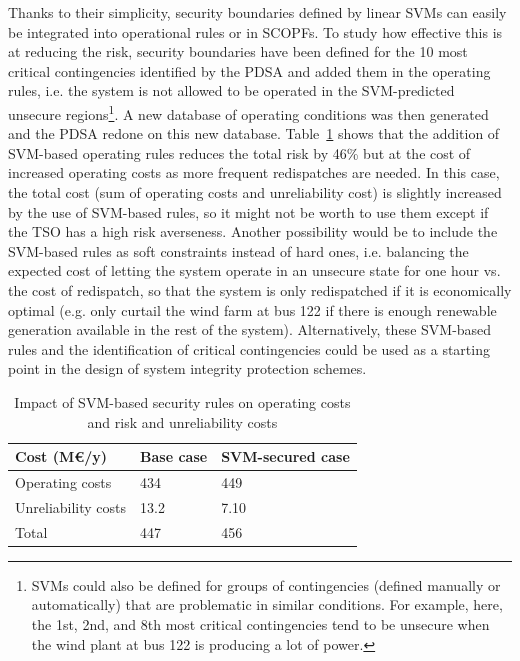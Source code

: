 Thanks to their simplicity, security boundaries defined by linear SVMs can easily be integrated into operational rules or in SCOPFs. To study how effective this is at reducing the risk, security boundaries have been defined for the 10 most critical contingencies identified by the PDSA and added them in the operating rules, i.e. the system is not allowed to be operated in the SVM-predicted unsecure regions\footnote{SVMs could also be defined for groups of contingencies (defined manually or automatically) that are problematic in similar conditions. For example, here, the 1st, 2nd, and 8th most critical contingencies tend to be unsecure when the wind plant at bus 122 is producing a lot of power.}. A new database of operating conditions was then generated and the PDSA redone on this new database. Table~\ref{tab:enhancement} shows that the addition of SVM-based operating rules reduces the total risk by 46\% but at the cost of increased operating costs as more frequent redispatches are needed. In this case, the total cost (sum of operating costs and unreliability cost) is slightly increased by the use of SVM-based rules, so it might not be worth to use them except if the TSO has a high risk averseness. Another possibility would be to include the SVM-based rules as soft constraints instead of hard ones, i.e. balancing the expected cost of letting the system operate in an unsecure state for one hour vs. the cost of redispatch, so that the system is only redispatched if it is economically optimal (e.g. only curtail the wind farm at bus 122 if there is enough renewable generation available in the rest of the system). Alternatively, these SVM-based rules and the identification of critical contingencies could be used as a starting point in the design of system integrity protection schemes.

\begin{table}
  \centering
  \caption{Impact of SVM-based security rules on operating costs and risk and unreliability costs}
  \label{tab:enhancement}
  \begin{tabular}{@{}lll@{}}
  \toprule
  Cost (M€/y) & Base case & SVM-secured case \\ \midrule
  Operating costs     & 434 & 449 \\
  Unreliability costs & 13.2  & 7.10 \\
  Total              & 447 & 456  \\ \bottomrule
  \end{tabular}
\end{table}

